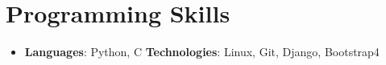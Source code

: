 \documentclass[letterpaper,11pt]{article}
\makeatletter
\newcommand{\resumeItem}[2]{
  \item\small{
    \textbf{#1}{ #2 \vspace{-2pt}}
  }
}
\newcommand{\resumeSubheading}[4]{
  \vspace{-1pt}\item
    \begin{tabular*}{0.97\textwidth}[t]{l@{\extracolsep{\fill}}r}
      \textbf{#1} & #2 \\
      \textit{\small#3} & \textit{\small #4} \\
    \end{tabular*}\vspace{-5pt}
}
\newcommand{\resumeSubHeadingListStart}{\begin{itemize}[leftmargin=*]}
\newcommand{\resumeSubHeadingListEnd}{\end{itemize}}
\newcommand{\resumeItemListStart}{\begin{itemize}}
\newcommand{\resumeItemListEnd}{\end{itemize}\vspace{-5pt}}
\makeatother
\begin{document}


%
\section{\Large{\textbf{Programming Skills}}}
  \resumeSubHeadingListStart
    \item{
      \textbf{Languages}{: Python, C}
      \hfill
      \textbf{Technologies}{: Linux, Git, Django, Bootstrap4}
    }
  \resumeSubHeadingListEnd


\end{document}
